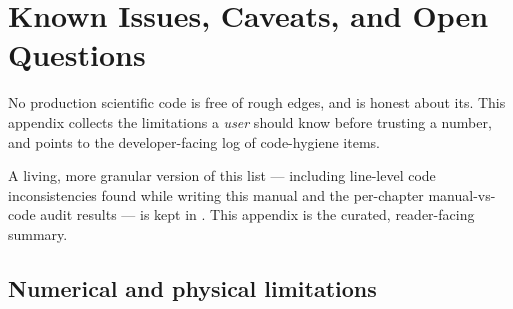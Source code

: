 \chapter{Known Issues, Caveats, and Open Questions}
\label{app:known-issues}

No production scientific code is free of rough edges, and \Daedalus{} is honest
about its.  This appendix collects the limitations a \emph{user} should know
before trusting a number, and points to the developer-facing log of code-hygiene
items.

\begin{note}
A living, more granular version of this list --- including line-level code
inconsistencies found while writing this manual and the per-chapter
manual-vs-code audit results --- is kept in
.  This appendix is the curated,
reader-facing summary.
\end{note}

\section{Numerical and physical limitations}

